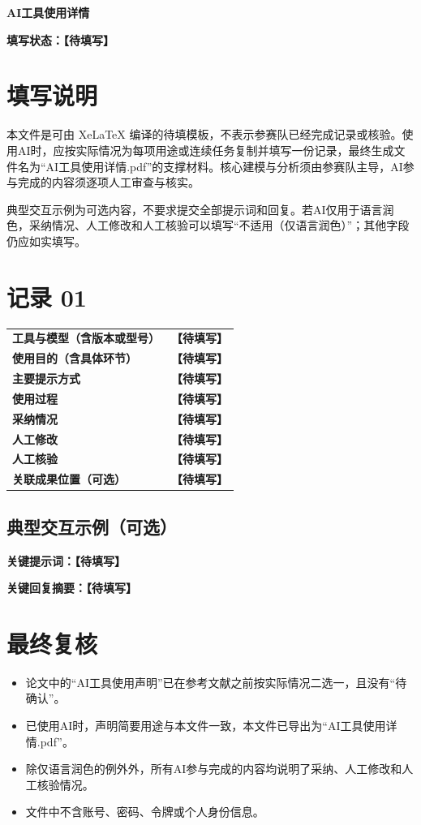 \documentclass[UTF8,a4paper,11pt]{ctexart}
\newcommand{\pending}{\textcolor{PendingColor}{\textbf{【待填写】}}}
\begin{document}
\begin{center}
  {\LARGE\bfseries AI工具使用详情}
\end{center}

\noindent\textbf{填写状态：}\pending

\section*{填写说明}

本文件是可由 XeLaTeX 编译的待填模板，不表示参赛队已经完成记录或核验。使用AI时，应按实际情况为每项用途或连续任务复制并填写一份记录，最终生成文件名为“AI工具使用详情.pdf”的支撑材料。核心建模与分析须由参赛队主导，AI参与完成的内容须逐项人工审查与核实。

典型交互示例为可选内容，不要求提交全部提示词和回复。若AI仅用于语言润色，采纳情况、人工修改和人工核验可以填写“不适用（仅语言润色）”；其他字段仍应如实填写。

\section*{记录 01}

\begin{longtable}{>{\bfseries}p{}p{}}
工具与模型（含版本或型号） & \pending \\
使用目的（含具体环节） & \pending \\
主要提示方式 & \pending \\
使用过程 & \pending \\
采纳情况 & \pending \\
人工修改 & \pending \\
人工核验 & \pending \\
关联成果位置（可选） & \pending \\
\end{longtable}

\subsection*{典型交互示例（可选）}

\noindent\textbf{关键提示词：}\pending

\medskip
\noindent\textbf{关键回复摘要：}\pending

\section*{最终复核}

\begin{itemize}
  \item 论文中的“AI工具使用声明”已在参考文献之前按实际情况二选一，且没有“待确认”。
  \item 已使用AI时，声明简要用途与本文件一致，本文件已导出为“AI工具使用详情.pdf”。
  \item 除仅语言润色的例外外，所有AI参与完成的内容均说明了采纳、人工修改和人工核验情况。
  \item 文件中不含账号、密码、令牌或个人身份信息。
\end{itemize}
\end{document}
